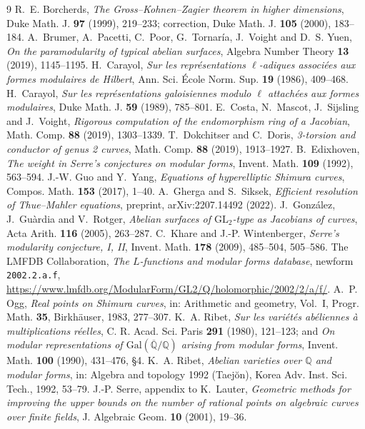 \documentclass[11pt,reqno]{amsart}
\theoremstyle{plain}
\theoremstyle{definition}
\newcommand{\Q}{\mathbb{Q}}
\begin{document}
\begin{thebibliography}{9}
 R.~E. Borcherds, \emph{The Gross--Kohnen--Zagier theorem in higher dimensions},
Duke Math. J. \textbf{97} (1999), 219--233; correction, Duke Math. J. \textbf{105} (2000), 183--184.
 A.~Brumer, A.~Pacetti, C.~Poor, G.~Tornar\'ia, J.~Voight and D.~S. Yuen, \emph{On
the paramodularity of typical abelian surfaces}, Algebra Number Theory \textbf{13} (2019),
1145--1195.
 H.~Carayol, \emph{Sur les repr\'esentations $\ell$-adiques associ\'ees aux formes
modulaires de Hilbert}, Ann. Sci. \'Ecole Norm. Sup. \textbf{19} (1986), 409--468.
 H.~Carayol, \emph{Sur les repr\'esentations galoisiennes modulo $\ell$
attach\'ees aux formes modulaires}, Duke Math. J. \textbf{59} (1989), 785--801.
 E.~Costa, N.~Mascot, J.~Sijsling and J.~Voight, \emph{Rigorous computation of the
endomorphism ring of a Jacobian}, Math. Comp. \textbf{88} (2019), 1303--1339.
 T.~Dokchitser and C.~Doris, \emph{3-torsion and conductor of genus 2 curves}, Math.
Comp. \textbf{88} (2019), 1913--1927.
 B.~Edixhoven, \emph{The weight in Serre's conjectures on modular forms},
Invent. Math. \textbf{109} (1992), 563--594.
 J.-W. Guo and Y.~Yang, \emph{Equations of hyperelliptic Shimura curves}, Compos. Math.
\textbf{153} (2017), 1--40.
 A.~Gherga and S.~Siksek, \emph{Efficient resolution of Thue--Mahler equations},
preprint, arXiv:2207.14492 (2022).
 J.~Gonz\'alez, J.~Gu\`ardia and V.~Rotger, \emph{Abelian surfaces of $\mathrm{GL}_2$-type
as Jacobians of curves}, Acta Arith. \textbf{116} (2005), 263--287.
 C.~Khare and J.-P. Wintenberger, \emph{Serre's modularity conjecture, I, II}, Invent.
Math. \textbf{178} (2009), 485--504, 505--586.
 The LMFDB Collaboration, \emph{The $L$-functions and modular forms database},
newform \texttt{2002.2.a.f}, \url{https://www.lmfdb.org/ModularForm/GL2/Q/holomorphic/2002/2/a/f/}.
 A.~P. Ogg, \emph{Real points on Shimura curves}, in: Arithmetic and geometry, Vol.~I,
Progr. Math. \textbf{35}, Birkh\"auser, 1983, 277--307.
 K.~A. Ribet, \emph{Sur les vari\'et\'es ab\'eliennes \`a multiplications
r\'eelles}, C. R. Acad. Sci. Paris \textbf{291} (1980), 121--123; and \emph{On modular
representations of $\mathrm{Gal}(\overline{\Q}/\Q)$ arising from modular forms}, Invent. Math.
\textbf{100} (1990), 431--476, \S4.
 K.~A. Ribet, \emph{Abelian varieties over $\Q$ and modular forms}, in: Algebra and
topology 1992 (Taej\u{o}n), Korea Adv. Inst. Sci. Tech., 1992, 53--79.
 J.-P. Serre, appendix to K.~Lauter, \emph{Geometric methods for improving
the upper bounds on the number of rational points on algebraic curves over finite fields}, J.
Algebraic Geom. \textbf{10} (2001), 19--36.
\end{thebibliography}
\end{document}
